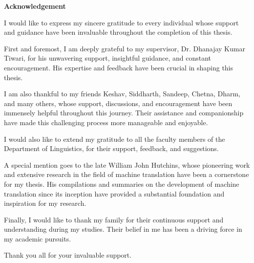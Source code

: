 \clearpage

\begin{center}
    \textbf{\Large Acknowledgement}
\end{center}

\vspace{1cm}
\onehalfspacing
\noindent

I would like to express my sincere gratitude to every individual whose support and guidance have been invaluable throughout the completion of this thesis.

First and foremost, I am deeply grateful to my supervisor, Dr. Dhanajay Kumar Tiwari, for his unwavering support, insightful guidance, and constant encouragement. His expertise and feedback have been crucial in shaping this thesis.

I am also thankful to my friends Keshav, Siddharth, Sandeep, Chetna, Dharm, and many others, whose support, discussions, and encouragement have been immensely helpful throughout this journey. Their assistance and companionship have made this challenging process more manageable and enjoyable.

I would also like to extend my gratitude to all the faculty members of the Department of Linguistics, for their support, feedback, and suggestions.

A special mention goes to the late William John Hutchins, whose pioneering work and extensive research in the field of machine translation have been a cornerstone for my thesis. His compilations and summaries on the development of machine translation since its inception have provided a substantial foundation and inspiration for my research.

Finally, I would like to thank my family for their continuous support and understanding during my studies. Their belief in me has been a driving force in my academic pursuits.

Thank you all for your invaluable support.

\vspace{2cm}
\doublespacing

\clearpage